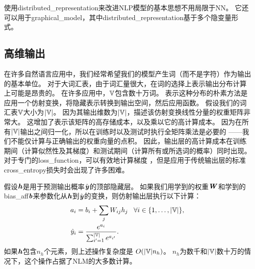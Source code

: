 
使用\gls{distributed_representation}来改进\gls{NLP}模型的基本思想不用局限于\gls{NN}。
它还可以用于\gls{graphical_model}，其中\gls{distributed_representation}基于多个隐变量形式。

\subsection{高维输出}
\label{sec:high_dimensional_outputs}

在许多自然语言应用中，我们经常希望我们的模型产生词（而不是字符）作为输出的基本单位。
对于大词汇表，由于词汇量很大，在词的选择上表示输出分布计算上可能是昂贵的。
在许多应用中，$\mathbb{V}$包含数十万词。
表示这种分布的朴素方法是应用一个仿射变换，将隐藏表示转换到输出空间，然后应用函数。
假设我们的词汇表$\mathbb{V}$大小为$| \mathbb{V} |$。
因为其输出维数为$| \mathbb{V} |$，描述该仿射变换线性分量的权重矩阵非常大。
这增加了表示该矩阵的高存储成本，以及乘以它的高计算成本。
因为在所有$| \mathbb{V} |$输出之间归一化，所以在训练时以及测试时执行全矩阵乘法是必要的 ——我们不能仅计算与正确输出的权重向量的点积。
因此，输出层的高计算成本在训练期间（计算似然性及其梯度）和测试期间（计算所有或所选词的概率）同时出现。
对于专门的\gls{loss_function}，可以有效地计算梯度 \citep{Vincent2015}，但是应用于传统输出层的标准\gls{cross_entropy}损失时会出现了许多困难。

假设$\boldsymbol{\mathit{h}}$是用于预测输出概率$\hat {\boldsymbol{\mathit{y}}}$的顶部隐藏层。
如果我们用学到的权重$\boldsymbol{\mathit{W}}$和学到的\gls{bias_aff}$\boldsymbol{\mathit{b}}$来参数化从$\boldsymbol{\mathit{h}}$到$\hat {\boldsymbol{\mathit{y}}}$的变换，则仿射输出层执行以下计算：
\begin{align}
\label{eq:softmax-over-words}
  a_i &= b_i + \sum_j  W_{ij} h_j \;\;\; \forall i \in \{1,\ldots,|\mathbb{V}|\}, \\
  \hat{y}_i &= \frac{e^{a_i}}{\sum_{i'=1}^{|\mathbb{V}|} e^{a_{i'}}}.
\end{align}
如果$\boldsymbol{\mathit{h}}$包含$n_h$个元素，则上述操作复杂度是 $O(|\mathbb{V}| n_h)$。
$n_h$为数千和$| \mathbb{V} |$数十万的情况下，这个操作占据了\gls{NLM}的大多数计算。


